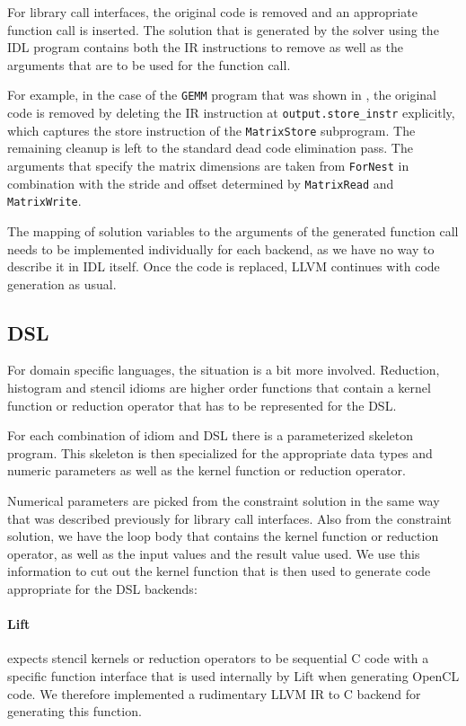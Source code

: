     For library call interfaces, the original code is removed and an appropriate
    function call is inserted.
    The solution that is generated by the solver using the IDL program contains
    both the IR instructions to remove as well as the arguments that are to be
    used for the function call.

    For example, in the case of the {\tt GEMM} program that was shown in
    , the original code is removed by deleting the IR
    instruction at {\tt output.store\_instr} explicitly, which captures the
    store instruction of the {\tt MatrixStore} subprogram.
    The remaining cleanup is left to the standard dead code elimination pass.
    The arguments that specify the matrix dimensions are taken from
    {\tt ForNest} in combination with the stride and offset determined by
    {\tt MatrixRead} and {\tt MatrixWrite}.

    The mapping of solution variables to the arguments of the generated function
    call needs to be implemented individually for each backend, as we have no
    way to describe it in IDL itself.
    Once the code is replaced, LLVM continues with code generation as usual.

\subsection{DSL}

    For domain specific languages, the situation is a bit more involved.
    Reduction, histogram and stencil idioms are higher order functions that
    contain a kernel function or reduction operator that has to be represented
    for the DSL.

    For each combination of idiom and DSL there is a parameterized
    skeleton program.
    This skeleton is then specialized for the appropriate data types and numeric
    parameters as well as the kernel function or reduction operator.

    Numerical parameters are picked from the constraint solution in the same way
    that was described previously for library call interfaces.
    Also from the constraint solution, we have the loop body that contains the
    kernel function or reduction operator, as well as the input values and the
    result value used.
    We use this information to cut out the kernel function that is then used to
    generate code appropriate for the DSL backends:

\paragraph{Lift}  expects stencil kernels or reduction operators to be sequential C code with a specific function interface that
is used internally by Lift when generating OpenCL code.
We therefore implemented a rudimentary LLVM IR to C backend for generating this function.

